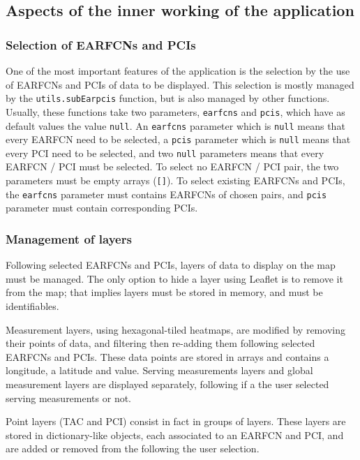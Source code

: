 \documentclass[a4paper, 11pt]{report}
\begin{document}
    \subsection{Aspects of the inner working of the application}

    \subsubsection{Selection of EARFCNs and PCIs}
    One of the most important features of the application is the selection by the use of EARFCNs and PCIs
    of data to be displayed. This selection is mostly managed by the \texttt{utils.subEarpcis} function,
    but is also managed by other functions. Usually, these functions take two parameters, \texttt{earfcns} and
    \texttt{pcis}, which have as default values the value \texttt{null}. An \texttt{earfcns} parameter which
    is \texttt{null} means that every EARFCN need to be selected,  a \texttt{pcis} parameter which
    is \texttt{null} means that every PCI need to be selected, and two \texttt{null} parameters means that every
    EARFCN / PCI must be selected. To select no EARFCN / PCI pair, the two parameters must be empty arrays (\texttt{[]}).
    To select existing EARFCNs and PCIs, the \texttt{earfcns} parameter must contains EARFCNs of chosen pairs, and
    \texttt{pcis} parameter must contain corresponding PCIs.

    \subsubsection{Management of layers}

    Following selected EARFCNs and PCIs, layers of data to display on the map must be managed. 
    The only option to hide a layer using Leaflet is to remove it from the map; that implies layers
    must be stored in memory, and must be identifiables.\newline

    Measurement layers, using hexagonal-tiled heatmaps, are modified by removing their points of data, and
    filtering then re-adding them following selected EARFCNs and PCIs. These data points are stored in arrays
    and contains a longitude, a latitude and value. Serving measurements layers and global measurement
    layers are displayed separately, following if a the user selected serving measurements or not. \newline
    
    Point layers (TAC and PCI) consist in fact in groups of layers. These layers are stored in dictionary-like objects, each associated
    to an EARFCN and PCI, and are added or removed from the following the user selection. \newline
\end{document}
